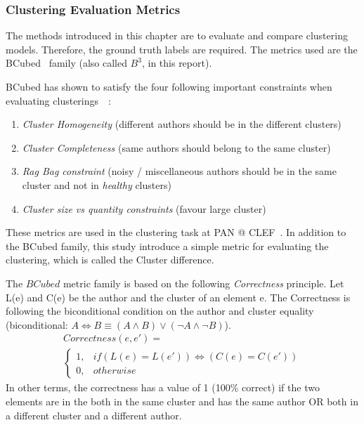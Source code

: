 \subsubsection{Clustering Evaluation Metrics}

The methods introduced in this chapter are to evaluate and compare clustering models.
Therefore, the ground truth labels are required.
The metrics used are the BCubed~\cite{bcubed} family (also called $B^3$, in this report).

BCubed has shown to satisfy the four following important constraints when evaluating clusterings~\cite{bcubed}~:

\begin{enumerate}
  \item
  \textit{Cluster Homogeneity} (different authors should be in the different clusters)
  \item
  \textit{Cluster Completeness} (same authors should belong to the same cluster)
  \item
  \textit{Rag Bag constraint} (noisy / miscellaneous authors should be in the same cluster and not in \textit{healthy} clusters)
  \item
  \textit{Cluster size vs quantity constraints} (favour large cluster)
\end{enumerate}

These metrics are used in the clustering task at PAN @ CLEF~\cite{pan16}.
In addition to the BCubed family, this study introduce a simple metric for evaluating the clustering, which is called the Cluster difference.

\begin{definition}
  The $BCubed$ metric family is based on the following \textit{Correctness} principle.
  Let L(e) and C(e) be the author and the cluster of an element e.
  The Correctness is following the biconditional condition on the author and cluster equality (biconditional: $A \Longleftrightarrow B \equiv (A \land B) \lor (\neg A \land \neg B)$).
  \begin{gather*}
    Correctness(e, e') = \\
    \begin{cases}
      1, & if (L(e) = L(e')) \Longleftrightarrow (C(e) = C(e'))\\
      0, & otherwise
    \end{cases}
  \end{gather*}
  In other terms, the correctness has a value of 1 (100\% correct) if the two elements are in the both in the same cluster and has the same author OR both in a different cluster and a different author.
\end{definition}


